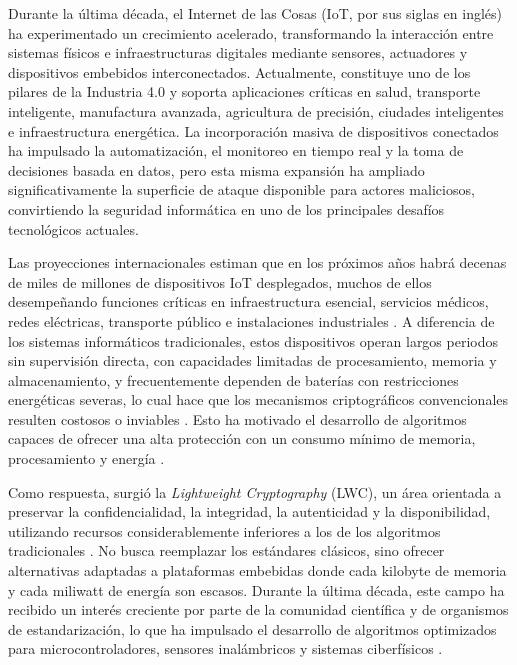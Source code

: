 
Durante la última década, el Internet de las Cosas (IoT, por sus siglas en inglés) ha experimentado un crecimiento acelerado, transformando la interacción entre sistemas físicos e infraestructuras digitales mediante sensores, actuadores y dispositivos embebidos interconectados. Actualmente, constituye uno de los pilares de la Industria 4.0 y soporta aplicaciones críticas en salud, transporte inteligente, manufactura avanzada, agricultura de precisión, ciudades inteligentes e infraestructura energética. La incorporación masiva de dispositivos conectados ha impulsado la automatización, el monitoreo en tiempo real y la toma de decisiones basada en datos, pero esta misma expansión ha ampliado significativamente la superficie de ataque disponible para actores maliciosos, convirtiendo la seguridad informática en uno de los principales desafíos tecnológicos actuales.

Las proyecciones internacionales estiman que en los próximos años habrá decenas de miles de millones de dispositivos IoT desplegados, muchos de ellos desempeñando funciones críticas en infraestructura esencial, servicios médicos, redes eléctricas, transporte público e instalaciones industriales \cite{Sinha2025StateGlobally}. A diferencia de los sistemas informáticos tradicionales, estos dispositivos operan largos periodos sin supervisión directa, con capacidades limitadas de procesamiento, memoria y almacenamiento, y frecuentemente dependen de baterías con restricciones energéticas severas, lo cual hace que los mecanismos criptográficos convencionales resulten costosos o inviables \cite{McKay2017ReportCryptography,Thakor2021LightweightOpportunities}. Esto ha motivado el desarrollo de algoritmos capaces de ofrecer una alta protección con un consumo mínimo de memoria, procesamiento y energía \cite{Dhanda2020LightweightIoT,Seyhan2022ClassificationTaxonomy}.

Como respuesta, surgió la \textit{Lightweight Cryptography} (LWC), un área orientada a preservar la confidencialidad, la integridad, la autenticidad y la disponibilidad, utilizando recursos considerablemente inferiores a los de los algoritmos tradicionales \cite{McKay2017ReportCryptography}. No busca reemplazar los estándares clásicos, sino ofrecer alternativas adaptadas a plataformas embebidas donde cada kilobyte de memoria y cada miliwatt de energía son escasos. Durante la última década, este campo ha recibido un interés creciente por parte de la comunidad científica y de organismos de estandarización, lo que ha impulsado el desarrollo de algoritmos optimizados para microcontroladores, sensores inalámbricos y sistemas ciberfísicos \cite{Althobaiti2025LightweightStandardization,Radhakrishnan2024EfficiencyDevices}.

